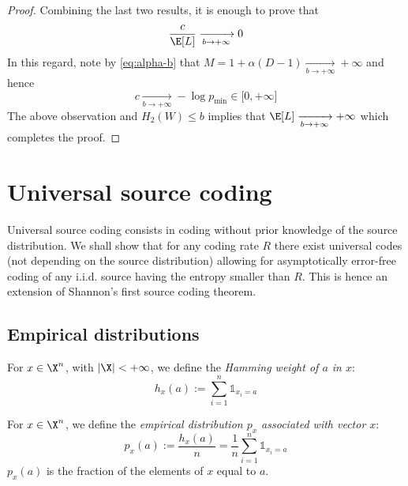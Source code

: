\documentclass[toc]{../cs-classes/cs-classes}
\begin{document}
\begin{proof}
    Combining the last two results, it is enough to prove that
    \begin{equation*}
        \frac{c}{\E[L]} \xrightarrow[b\to+\infty]{} 0
    \end{equation*}
    In this regard, note by \eqref{eq:alpha-b} that $M=1+\alpha(D-1) \xrightarrow[b\to+\infty]{} +\infty$ and hence
    \begin{equation*}
        c \xrightarrow[b\to+\infty]{} -\log p_{\min} \in \lbrack0, +\infty\rbrack
    \end{equation*}
    The above observation and $H_2(W)\leq b$ implies that $\E[L] \xrightarrow[b\to+\infty]{} +\infty$ which completes the proof.
\end{proof}

\section{Universal source coding}
Universal source coding consists in coding without prior knowledge of the source distribution. We shall show that for any coding rate $R$ there exist universal codes (not depending on the source distribution) allowing for asymptotically error-free coding of any i.i.d. source having the entropy smaller than $R$. This is hence an extension of Shannon's first source coding theorem.

\subsection{Empirical distributions}
\begin{definition}
    For $x\in\X^n$, with $|\X|<+\infty$, we define the \emph{Hamming weight of $a$ in $x$}:
    \begin{equation*}
        h_x(a) := \sum_{i=1}^n \mathds{1}_{x_i=a}
    \end{equation*}
\end{definition}

\begin{definition}
    For $x\in\X^n$, we define the \emph{empirical distribution $p_x$ associated with vector $x$}:
    \begin{equation*}
        p_x(a) := \frac{h_x(a)}{n}=\frac{1}{n}\sum_{i=1}^n \mathds{1}_{x_i=a}
    \end{equation*}
    $p_x(a)$ is the fraction of the elements of $x$ equal to $a$.
\end{definition}
\end{document}
